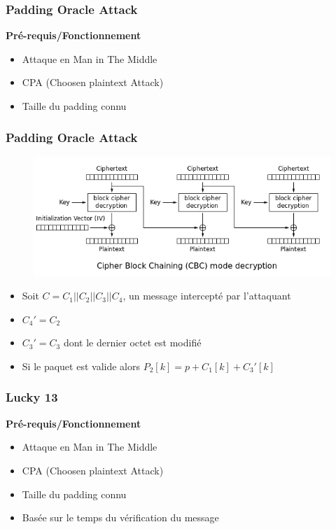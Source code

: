  
\begin{frame}
  \frametitle{Padding Oracle Attack}
  \textbf{Pré-requis/Fonctionnement}
  \begin{itemize}
  \item Attaque en Man in The Middle
  \item CPA (Choosen plaintext Attack)
  \item Taille du padding connu
  \end{itemize}
\end{frame}

\begin{frame}
  \frametitle{Padding Oracle Attack}
  \begin{figure}[h]
    \centering
  \includegraphics[scale=0.3]{CBC_Decrypt}
  \end{figure}

  \begin{itemize}
  \item  Soit $C = C_1 || C_2 || C_3 || C_4$, un message intercepté par l'attaquant
    \pause
  \item $C_4'=C_2$
    \pause
  \item $C_3'= C_3$ dont le dernier octet est modifié
    \pause
  \item Si le paquet est valide alors $P_2[k] = p + C_1[k] + C_3'[k]$ 
  \end{itemize}

\end{frame}

\begin{frame}

  \frametitle{Lucky 13}
  \textbf{Pré-requis/Fonctionnement}
  \begin{itemize}
  \item Attaque en Man in The Middle
  \item CPA (Choosen plaintext Attack)
  \item Taille du padding connu
  \item Basée sur le temps du vérification du message
  \end{itemize}
\end{frame}

